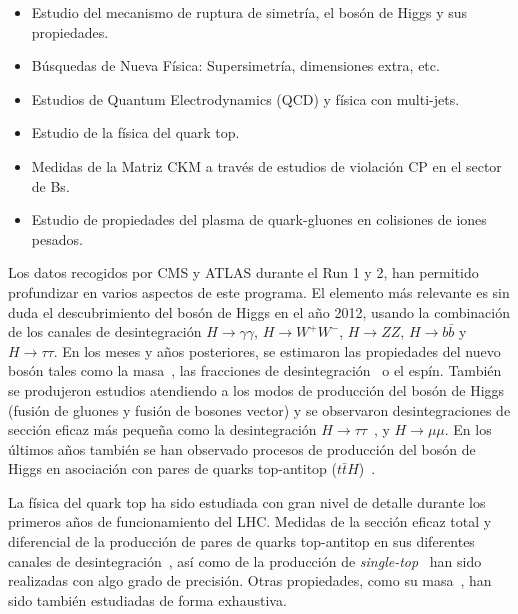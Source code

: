 \begin{itemize}
    \item Estudio del mecanismo de ruptura de simetría, el bosón de Higgs y sus propiedades.
    \item Búsquedas de Nueva Física: Supersimetría, dimensiones extra, etc.
    \item Estudios de Quantum Electrodynamics (QCD) y física con multi-jets.
    \item Estudio de la física del quark top.
    \item Medidas de la Matriz CKM a través de estudios de violación CP en el sector de Bs.
    \item Estudio de propiedades del plasma de quark-gluones en colisiones de iones pesados.
\end{itemize}

Los datos recogidos por CMS y ATLAS durante el Run 1 y 2, han permitido profundizar en varios aspectos de este programa. El elemento más relevante es sin duda el descubrimiento del bosón de Higgs en el año 2012, usando la combinación de los canales de desintegración $H\rightarrow\gamma\gamma$, $H\rightarrow W^{+}W^{-}$, $H\rightarrow ZZ$, $H\rightarrow b\bar{b}$ y $H\rightarrow\tau\tau$. En los meses y años posteriores, se estimaron las propiedades del nuevo bosón tales como la masa~\cite{Hmass1,Hmass2}, las fracciones de desintegración~\cite{Hcoup1,Hcoup2} o el espín\cite{Hspin1,Hspin2}. También se produjeron estudios atendiendo a los modos de producción del bosón de Higgs (fusión de gluones y fusión de bosones vector) y se observaron desintegraciones de sección eficaz más pequeña como la desintegración $H\rightarrow\tau\tau$~\cite{Htautau1,Htautau2}, y $H\rightarrow\mu\mu$\cite{Hmumu1,Hmumu2}. En los últimos años también se han observado procesos de producción del bosón de Higgs en asociación con pares de quarks top-antitop ($t\bar{t}H$)~\cite{tth1,tth2}. 

La física del quark top ha sido estudiada con gran nivel de detalle durante los primeros años de funcionamiento del LHC. Medidas de la sección eficaz total y diferencial de la producción de pares de quarks top-antitop en sus diferentes canales de desintegración~\cite{topcross1,topcross2,topcross3,topcross4}, así como de la producción de \emph{single-top}~\cite{singletop1,singletop2} han sido realizadas con algo grado de precisión. Otras propiedades, como su masa~\cite{topmass1,topmass2}, han sido también estudiadas de forma exhaustiva.

